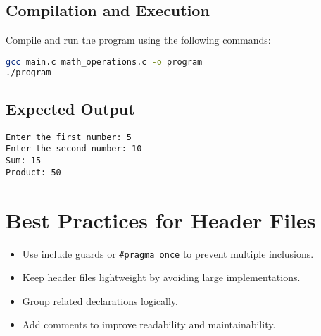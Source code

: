 \subsection{Compilation and Execution}
Compile and run the program using the following commands:
\begin{lstlisting}[language=bash, caption={Compilation and Execution Commands}]
gcc main.c math_operations.c -o program
./program
\end{lstlisting}

\subsection{Expected Output}
\begin{verbatim}
Enter the first number: 5
Enter the second number: 10
Sum: 15
Product: 50
\end{verbatim}

\section{Best Practices for Header Files}
\begin{itemize}
	\item Use include guards or \texttt{\#pragma once} to prevent multiple inclusions.
	\item Keep header files lightweight by avoiding large implementations.
	\item Group related declarations logically.
	\item Add comments to improve readability and maintainability.
\end{itemize}
